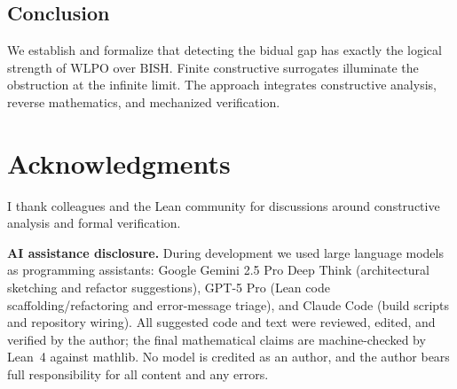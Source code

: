 \documentclass[11pt]{article}
\newcommand{\WLPO}{\mathrm{WLPO}}
\newcommand{\BISH}{\mathrm{BISH}}
\begin{document}
\subsection{Conclusion}

We establish and formalize that detecting the bidual gap has exactly the logical strength of $\WLPO$ over $\BISH$. Finite constructive surrogates illuminate the obstruction at the infinite limit. The approach integrates constructive analysis, reverse mathematics, and mechanized verification.

\section*{Acknowledgments}

I thank colleagues and the Lean community for discussions around constructive analysis and formal verification.

\smallskip
\noindent\textbf{AI assistance disclosure.} During development we used large language models as programming assistants: Google Gemini 2.5 Pro Deep Think (architectural sketching and refactor suggestions), GPT-5 Pro (Lean code scaffolding/refactoring and error-message triage), and Claude Code (build scripts and repository wiring). All suggested code and text were reviewed, edited, and verified by the author; the final mathematical claims are machine-checked by Lean~4 against mathlib. No model is credited as an author, and the author bears full responsibility for all content and any errors.
\end{document}
